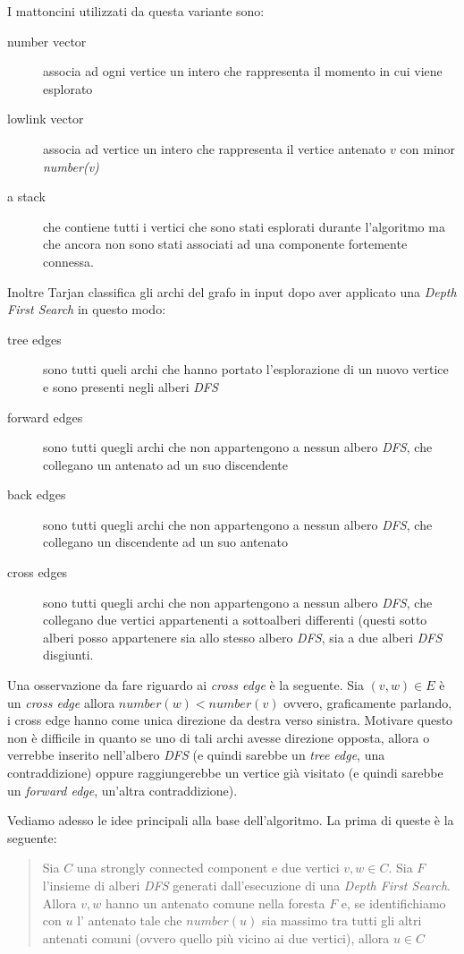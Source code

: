 I mattoncini utilizzati da questa variante sono:
\begin{description}
\item[number vector] associa ad ogni vertice un intero che rappresenta
  il momento in cui viene esplorato
\item[lowlink vector] associa ad vertice un intero che rappresenta il
  vertice antenato $v$ con minor \emph{number(v)}
\item[a stack] che contiene tutti i vertici che sono stati esplorati
  durante l'algoritmo ma che ancora non sono stati associati ad una
  componente fortemente connessa.
\end{description}

Inoltre Tarjan classifica gli archi del grafo in input dopo aver
applicato una \emph{Depth First Search} in questo modo: 
\begin{description}
\item[tree edges] sono tutti queli archi che hanno portato
  l'esplorazione di un nuovo vertice e sono presenti negli alberi
  \emph{DFS}
\item[forward edges] sono tutti quegli archi che non appartengono a
  nessun albero \emph{DFS}, che collegano un antenato ad un suo
  discendente
\item[back edges] sono tutti quegli archi che non appartengono a
  nessun albero \emph{DFS}, che collegano un discendente ad un suo
  antenato
\item[cross edges] sono tutti quegli archi che non appartengono a
  nessun albero \emph{DFS}, che collegano due vertici appartenenti a
  sottoalberi differenti (questi sotto alberi posso appartenere sia
  allo stesso albero \emph{DFS}, sia a due alberi \emph{DFS}
  disgiunti.
\end{description}

Una osservazione da fare riguardo ai \emph{cross edge} \`e la
seguente. Sia $(v, w) \in E$ \`e un \emph{cross edge} allora
$number(w) < number(v)$ ovvero, graficamente parlando, i cross edge
hanno come unica direzione da destra verso sinistra. Motivare questo
non \`e difficile in quanto se uno di tali archi avesse direzione
opposta, allora o verrebbe inserito nell'albero \emph{DFS} (e quindi
sarebbe un \emph{tree edge}, una contraddizione) oppure raggiungerebbe
un vertice gi\`a visitato (e quindi sarebbe un \emph{forward edge},
un'altra contraddizione).

Vediamo adesso le idee principali alla base dell'algoritmo. La prima
di queste \`e la seguente:
\begin{quotation}
  Sia $C$ una strongly connected component e due vertici $v, w \in
  C$. Sia $F$ l'insieme di alberi \emph{DFS} generati dall'esecuzione
  di una \emph{Depth First Search}. Allora $v, w$ hanno un antenato
  comune nella foresta $F$ e, se identifichiamo con $u$ l' antenato
  tale che $number(u)$ sia massimo tra tutti gli altri antenati comuni
  (ovvero quello pi\`u vicino ai due vertici), allora $u \in C$
\end{quotation}


